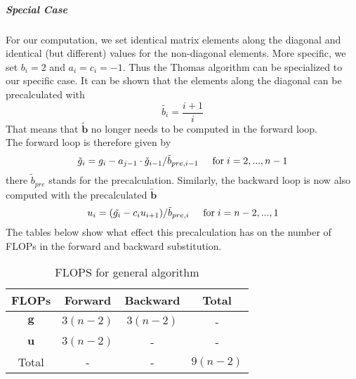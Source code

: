 \documentclass[%
oneside,                 %
final,                   %
10pt]{article}
\begin{document}
\subparagraph{Special Case}
For our computation, we set identical matrix elements along the diagonal and identical (but different) values for the non-diagonal elements. More specific, we set $b_i = 2$ and $a_i = c_i = -1$. Thus the Thomas algorithm can be specialized to our specific case. It can be shown that the elements along the diagonal can be precalculated with
\begin{equation*}
\tilde{b_i} = \frac{i+1}{i}
\end{equation*}
That means that $\mathbf{\tilde{b}}$ no longer needs to be computed in the forward loop. \\
The forward loop is therefore given by
\begin{equation*}
\tilde{g}_i = g_i - a_{j-1} \cdot \tilde{g}_{i-1} / \tilde{b}_{pre, i-1}  \hspace{0.5cm} \mathrm{for} \hspace{0.1cm} i=2,..., n-1 \\
\end{equation*}
there $\tilde{b}_{pre}$ stands for the precalculation.
Similarly, the backward loop is now also computed with the precalculated $\mathbf{\tilde{b}}$
\begin{equation*}
u_i = ( \tilde{g_i}-c_i u_{i+1} )/ \tilde{b}_{pre,i} \hspace{0.5cm} \mathrm{for} \hspace{0.1cm} i=n-2,...,1
\end{equation*}
The tables below show what effect this precalculation has on the number of FLOPs in the forward and backward substitution.

\begin{table}[ht]
\caption{FLOPS for general algorithm}
\centering
	\begin{tabular}{c c c c}
		\hline
		FLOPs   & Forward & Backward & Total \\ [0.5ex]
		\hline
		$\mathbf{g}$ & $3 (n-2)$       & $3 (n-2)$        & -    \\
        	$\mathbf{u}$ & $3 (n-2)$       & -        & -     \\
        	Total        & -       & -        &  $9 (n-2)$      \\ [1ex]
		\hline
	\end{tabular}
\end{table}
\end{document}
